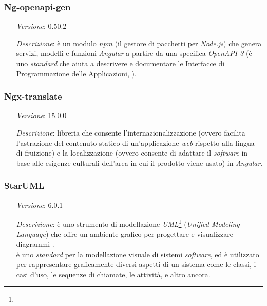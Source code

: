     \subsubsection*{Ng-openapi-gen}
    \begin{itemize}
        \item [\textit{Versione}:] 0.50.2
        \item [\textit{Descrizione}:] è un modulo \textit{npm} (il gestore di pacchetti per \textit{Node.js}) che genera servizi,
                    modelli e funzioni \textit{Angular} a partire da una specifica \textit{OpenAPI 3} (è uno \textit{standard} che aiuta a descrivere e documentare le Interfacce di Programmazione delle Applicazioni, ).
    \end{itemize}

    \subsubsection*{Ngx-translate}
    \begin{itemize}
        \item [\textit{Versione}:] 15.0.0
        \item [\textit{Descrizione}:] libreria che consente l'internazionalizzazione (ovvero facilita l'astrazione del contenuto statico di un'applicazione \textit{web} rispetto alla lingua di fruizione) e la localizzazione (ovvero consente di adattare il \textit{software} in base alle esigenze culturali dell'area in cui il prodotto viene usato) in \textit{Angular}.
    \end{itemize}

    \subsubsection*{StarUML}
    \begin{itemize}
        \item [\textit{Versione}:] 6.0.1
        \item [\textit{Descrizione}:] è uno strumento di modellazione \textit{UML}\footnote{} (\textit{Unified Modeling Language}) che offre un ambiente grafico per progettare e visualizzare diagrammi . \\
                 è uno \textit{standard} per la modellazione visuale di sistemi \textit{software}, ed è utilizzato per rappresentare graficamente diversi aspetti di un sistema come le classi, i casi d'uso, le sequenze di chiamate, le attività, e altro ancora.
    \end{itemize}

